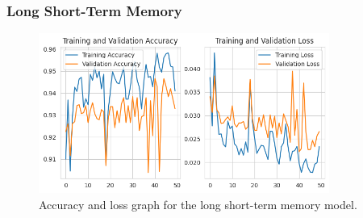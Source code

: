 \subsubsection{Long Short-Term Memory}

\begin{figure}[ht]
    \centering
    \includegraphics[width=0.85\textwidth]{./img/lstm/accuracy-loss-graph}
    \caption{Accuracy and loss graph for the long short-term memory model.}
    \label{fig:lstm-accuracy-loss-graph}
\end{figure}

